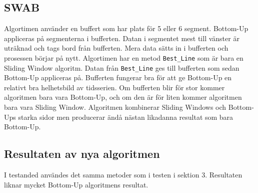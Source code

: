 \documentclass{article}
\begin{document}
\subsection{SWAB}

Algortimen använder en buffert som har plats för 5 eller 6 segment. Bottom-Up appliceras på segmenterna i bufferten. Datan i segmentet mest till vänster är uträknad och tags bord från bufferten. Mera data sätts in i bufferten och prosessen börjar på nytt. Algortimen har en metod \texttt{Best_Line} som är bara en Sliding Window algoritm. Datan från \texttt{Best_Line} ges till bufferten som sedan Bottom-Up appliceras på. Bufferten fungerar bra för att ge Bottom-Up en relativt bra helhetsbild av tidsserien. Om bufferten blir för stor kommer algoritmen bara vara Bottom-Up, och om den är för liten kommer algoritmen bara vara Sliding Window. Algoritmen kombinerar Sliding Windows och Bottom-Ups starka sidor men producerar ändå nästan likadanna resultat som bara Bottom-Up.

\subsection{Resultaten av nya algoritmen}

I testanded användes det samma metoder som i testen i sektion 3. Resultaten liknar mycket Bottom-Up algoritmens resultat.
\end{document}
